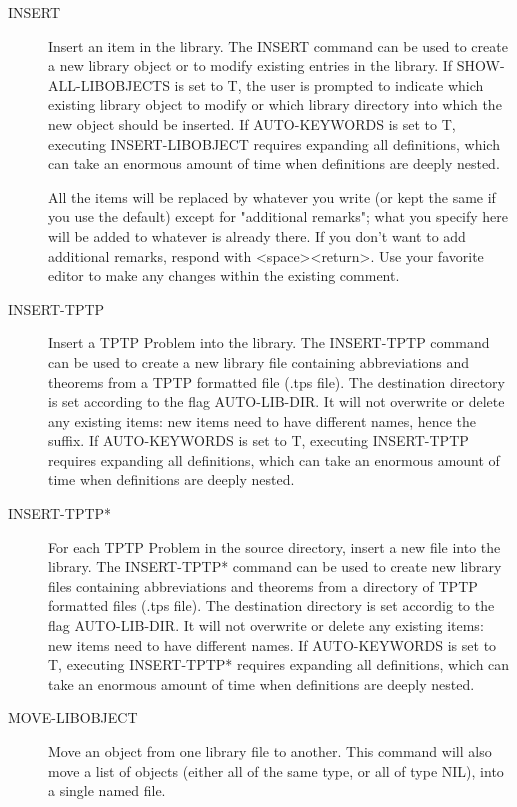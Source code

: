\begin{description}
\item[INSERT]  
Insert an item in the library. 
The INSERT command can be used to create a new library object or
to modify existing entries in the library.  If SHOW-ALL-LIBOBJECTS
is set to T, the user is prompted to indicate which existing
library object to modify or which library directory into which
the new object should be inserted. If AUTO-KEYWORDS is set to T, 
executing INSERT-LIBOBJECT requires expanding all definitions, 
which can take an enormous amount of time when definitions are 
deeply nested.

All the items will be replaced by whatever you write
(or kept the same if you use the default) except for "additional
remarks"; what you specify here will be added to whatever is already
there. If you don't want to add additional remarks, respond with
<space><return>. Use your favorite editor to make any changes within
the existing comment.

\item[INSERT-TPTP]  
Insert a TPTP Problem into the library. 
The INSERT-TPTP command can be used to create a new library file 
containing abbreviations and theorems from a TPTP formatted file 
(.tps file). The destination directory is set according to the flag
AUTO-LIB-DIR. It will not overwrite or delete any existing items: 
new items need to have different names, hence the suffix.
If AUTO-KEYWORDS is set to T, executing INSERT-TPTP requires 
expanding all definitions, which can take an enormous amount of time 
when definitions are deeply nested.

\item[INSERT-TPTP*]  
For each TPTP Problem in the source directory, insert 
a new file into the library. The INSERT-TPTP* command can be used 
to create new library files containing abbreviations and theorems 
from a directory of TPTP formatted files (.tps file). The destination
directory is set accordig to the flag AUTO-LIB-DIR. It will not 
overwrite or delete any existing items: new items need to have 
different names.
If AUTO-KEYWORDS is set to T, executing INSERT-TPTP* requires 
expanding all definitions, which can take an enormous amount of time 
when definitions are deeply nested.

\item[MOVE-LIBOBJECT]  
Move an object from one library file to another.
This command will also move a list of objects (either all of the same type, or
all of type NIL), into a single named file.


\end{description}
